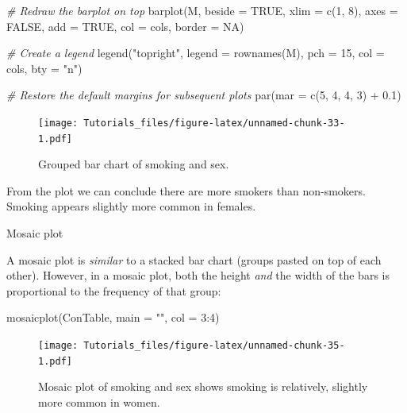 \documentclass[
]{book}
\newenvironment{Shaded}{\begin{snugshade}}{\end{snugshade}}
\newcommand{\AttributeTok}[1]{\textcolor[rgb]{0.77,0.63,0.00}{#1}}
\newcommand{\CommentTok}[1]{\textcolor[rgb]{0.56,0.35,0.01}{\textit{#1}}}
\newcommand{\ConstantTok}[1]{\textcolor[rgb]{0.00,0.00,0.00}{#1}}
\newcommand{\DecValTok}[1]{\textcolor[rgb]{0.00,0.00,0.81}{#1}}
\newcommand{\FloatTok}[1]{\textcolor[rgb]{0.00,0.00,0.81}{#1}}
\newcommand{\FunctionTok}[1]{\textcolor[rgb]{0.00,0.00,0.00}{#1}}
\newcommand{\NormalTok}[1]{#1}
\newcommand{\SpecialCharTok}[1]{\textcolor[rgb]{0.00,0.00,0.00}{#1}}
\newcommand{\StringTok}[1]{\textcolor[rgb]{0.31,0.60,0.02}{#1}}
\begin{document}
\begin{Shaded}
\begin{Highlighting}[]
\CommentTok{\# Redraw the barplot on top}
\FunctionTok{barplot}\NormalTok{(M, }\AttributeTok{beside =} \ConstantTok{TRUE}\NormalTok{, }\AttributeTok{xlim =} \FunctionTok{c}\NormalTok{(}\DecValTok{1}\NormalTok{, }\DecValTok{8}\NormalTok{), }\AttributeTok{axes =} \ConstantTok{FALSE}\NormalTok{, }\AttributeTok{add =} \ConstantTok{TRUE}\NormalTok{,}
        \AttributeTok{col =}\NormalTok{ cols, }\AttributeTok{border =} \ConstantTok{NA}\NormalTok{)}

\CommentTok{\# Create a legend}
\FunctionTok{legend}\NormalTok{(}\StringTok{"topright"}\NormalTok{, }\AttributeTok{legend =} \FunctionTok{rownames}\NormalTok{(M), }\AttributeTok{pch =} \DecValTok{15}\NormalTok{, }\AttributeTok{col =}\NormalTok{ cols, }\AttributeTok{bty =} \StringTok{"n"}\NormalTok{)}

\CommentTok{\# Restore the default margins for subsequent plots}
\FunctionTok{par}\NormalTok{(}\AttributeTok{mar =} \FunctionTok{c}\NormalTok{(}\DecValTok{5}\NormalTok{, }\DecValTok{4}\NormalTok{, }\DecValTok{4}\NormalTok{, }\DecValTok{3}\NormalTok{) }\SpecialCharTok{+} \FloatTok{0.1}\NormalTok{)}
\end{Highlighting}
\end{Shaded}

\begin{figure}
\centering
\texttt{[image: Tutorials\_files/figure-latex/unnamed-chunk-33-1.pdf]}
\caption{\label{fig:unnamed-chunk-33}Grouped bar chart of smoking and sex.}
\end{figure}

From the plot we can conclude there are more smokers than non-smokers. Smoking appears slightly more common in females.

Mosaic plot

A mosaic plot is \emph{similar} to a stacked bar chart (groups pasted on top of each other). However, in a mosaic plot, both the height \emph{and} the width of the bars is proportional to the frequency of that group:

\begin{Shaded}
\begin{Highlighting}[]
\FunctionTok{mosaicplot}\NormalTok{(ConTable, }\AttributeTok{main =} \StringTok{""}\NormalTok{, }\AttributeTok{col =} \DecValTok{3}\SpecialCharTok{:}\DecValTok{4}\NormalTok{)}
\end{Highlighting}
\end{Shaded}

\begin{figure}
\centering
\texttt{[image: Tutorials\_files/figure-latex/unnamed-chunk-35-1.pdf]}
\caption{\label{fig:unnamed-chunk-35}Mosaic plot of smoking and sex shows smoking is relatively, slightly more common in women.}
\end{figure}
\end{document}
